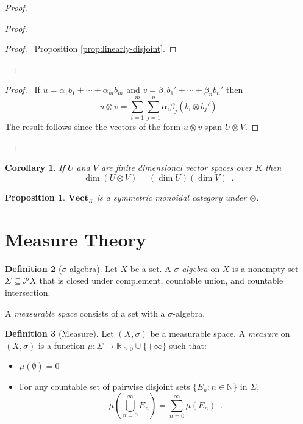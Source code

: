 \documentclass{book}
\let\qed\relax
\newtheorem{prop}{Proposition}[chapter]
\newtheorem{cor}{Corollary}[prop]
\theoremstyle{definition}
\newtheorem{df}[prop]{Definition}
\begin{document}
\begin{proof}
\pf
{}
\begin{proof}
	\begin{proof}
		\pf\ Proposition \ref{prop:linearly-disjoint}.
	\end{proof}
\end{proof}
\begin{proof}
	\pf\ If $u = \alpha_1 b_1 + \cdots + \alpha_m b_m$ and $v = \beta_1 b_1' + \cdots + \beta_n b_n'$ then
	\[ u \otimes v = \sum_{i=1}^m \sum_{j=1}^n \alpha_i \beta_j (b_i \otimes b_j') \]
	The result follows since the vectors of the form $u \otimes v$ span $U \otimes V$.
\end{proof}
\qed
\end{proof}

\begin{cor}
If $U$ and $V$ are finite dimensional vector spaces over $K$ then
\[ \dim (U \otimes V) = (\dim U)(\dim V) \enspace . \]
\end{cor}

\begin{prop}
$\mathbf{Vect}_K$ is a symmetric monoidal category under $\otimes$.
\end{prop}

\part{Measure Theory}

\begin{df}[$\sigma$-algebra]
Let $X$ be a set. A \emph{$\sigma$-algebra} on $X$ is a nonempty set $\Sigma \subseteq \mathcal{P} X$ that is closed under complement, countable union, and countable intersection.

A \emph{measurable space} consists of a set with a $\sigma$-algebra.
\end{df}

\begin{df}[Measure]
Let $(X, \sigma)$ be a measurable space. A \emph{measure} on $(X, \sigma)$ is a function $\mu : \Sigma \rightarrow \mathbb{R}_{\geq 0} \cup \{ + \infty \}$ such that:
\begin{itemize}
\item $\mu(\emptyset) = 0$
\item For any countable set of pairwise disjoint sets $\{ E_n : n \in \mathbb{N} \}$ in $\Sigma$,
\[ \mu \left( \bigcup_{n=0}^\infty E_n \right) = \sum_{n=0}^\infty \mu(E_n) \enspace . \]
\end{itemize}
\end{df}
\end{document}
